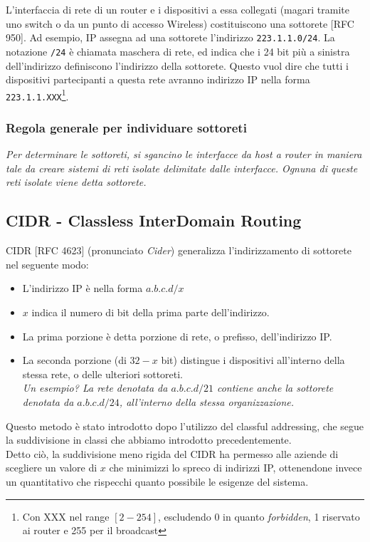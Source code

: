 L'interfaccia di rete di un router e i dispositivi a essa collegati (magari tramite uno switch o da un punto di accesso Wireless) costituiscono una sottorete [RFC 950]. Ad esempio, IP assegna ad una sottorete l'indirizzo \verb|223.1.1.0/24|. La notazione \verb|/24| è chiamata maschera di rete, ed indica che i 24 bit più a sinistra dell'indirizzo definiscono l'indirizzo della sottorete. Questo vuol dire che tutti i dispositivi partecipanti a questa rete avranno indirizzo IP nella forma \verb|223.1.1.XXX|\footnote{Con XXX nel range $[2-254]$, escludendo $0$ in quanto \textit{forbidden}, 1 riservato ai router e 255 per il broadcast}.



\subsubsection{Regola generale per individuare sottoreti}
\textit{Per determinare le sottoreti, si sgancino le interfacce da host a router in maniera tale da creare sistemi di reti isolate delimitate dalle interfacce. Ognuna di queste reti isolate viene detta sottorete.}

\newpage
\subsection{CIDR - Classless InterDomain Routing}
CIDR [RFC 4623] (pronunciato \textit{Cider}) generalizza l'indirizzamento di sottorete nel seguente modo:

\begin{itemize}
	\item L'indirizzo IP è nella forma $a.b.c.d/x$
	\item $x$ indica il numero di bit della prima parte dell'indirizzo.
	\item La prima porzione è detta porzione di rete, o prefisso, dell'indirizzo IP. 
	\item La seconda porzione (di $32-x$ bit) distingue i dispositivi all'interno della stessa rete, o delle ulteriori sottoreti.\\
	\textit{Un esempio? La rete denotata da $a.b.c.d/21$ contiene anche la sottorete denotata da $a.b.c.d/24$, all'interno della stessa organizzazione.}
\end{itemize}

Questo metodo è stato introdotto dopo l'utilizzo del classful addressing, che segue la suddivisione in classi che abbiamo introdotto precedentemente.\\ Detto ciò, la suddivisione meno rigida del CIDR ha permesso alle aziende di scegliere un valore di $x$ che minimizzi lo spreco di indirizzi IP, ottenendone invece un quantitativo che rispecchi quanto possibile le esigenze del sistema.

